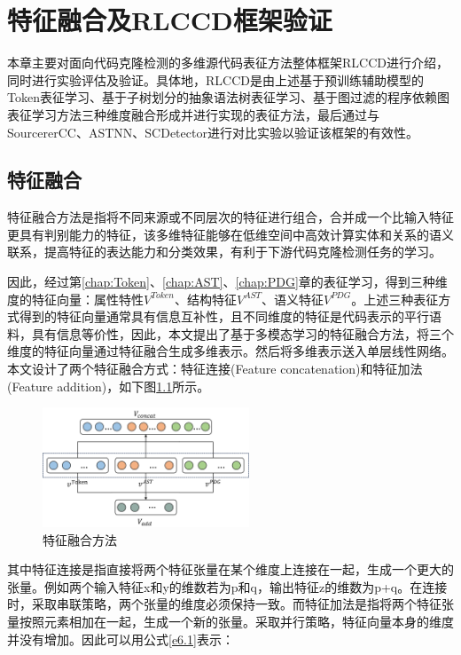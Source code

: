 \chapter{特征融合及RLCCD框架验证}
\label{chap:fusion}
本章主要对面向代码克隆检测的多维源代码表征方法整体框架RLCCD进行介绍，同时进行实验评估及验证。具体地，RLCCD是由上述基于预训练辅助模型的Token表征学习、基于子树划分的抽象语法树表征学习、基于图过滤的程序依赖图表征学习方法三种维度融合形成并进行实现的表征方法，最后通过与SourcererCC、ASTNN、SCDetector进行对比实验以验证该框架的有效性。
\section{特征融合}
特征融合方法是指将不同来源或不同层次的特征进行组合，合并成一个比输入特征更具有判别能力的特征，该多维特征能够在低维空间中高效计算实体和关系的语义联系，提高特征的表达能力和分类效果，有利于下游代码克隆检测任务的学习。

因此，经过第\ref{chap:Token}、\ref{chap:AST}、\ref{chap:PDG}章的表征学习，得到三种维度的特征向量：属性特性$V^{Token}$、结构特征$V^{AST}$、语义特征$V^{PDG}$。上述三种表征方式得到的特征向量通常具有信息互补性，且不同维度的特征是代码表示的平行语料，具有信息等价性，因此，本文提出了基于多模态学习的特征融合方法，将三个维度的特征向量通过特征融合生成多维表示。然后将多维表示送入单层线性网络。本文设计了两个特征融合方式：特征连接(Feature concatenation)和特征加法(Feature addition)，如下图\ref{fig:concat_add}所示。

\begin{figure}[H]
  \centering
  \includegraphics[width=0.55\textwidth]{figures/concat_add.png}
  \caption{特征融合方法}\label{fig:concat_add}
\end{figure}

其中特征连接是指直接将两个特征张量在某个维度上连接在一起，生成一个更大的张量。例如两个输入特征x和y的维数若为p和q，输出特征z的维数为p+q。在连接时，采取串联策略，两个张量的维度必须保持一致。而特征加法是指将两个特征张量按照元素相加在一起，生成一个新的张量。采取并行策略，特征向量本身的维度并没有增加。因此可以用公式\ref{e6.1}表示：

